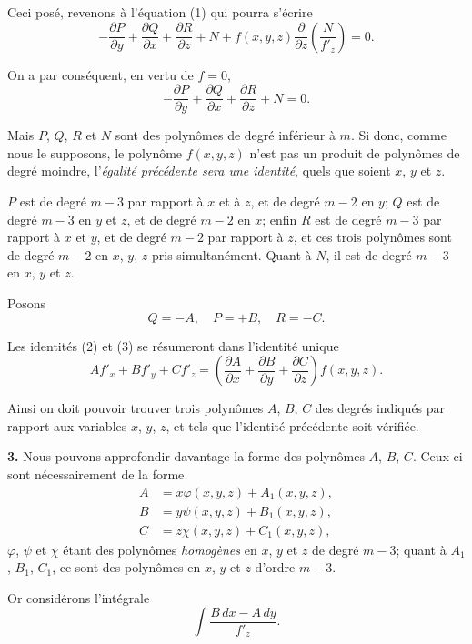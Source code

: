 \documentclass{article}
\begin{document}

Ceci posé, revenons à l'équation (1) qui pourra s'écrire
\[
-\frac{\partial P}{\partial y} + \frac{\partial Q}{\partial x} + \frac{\partial R}{\partial z} + N + f(x, y, z)\frac{\partial}{\partial z}\left(\frac{N}{f'_{z}}\right) = 0.
\]

On a par conséquent, en vertu de $f = 0$,
\[
-\frac{\partial P}{\partial y} + \frac{\partial Q}{\partial x} + \frac{\partial R}{\partial z} + N = 0. \tag{3}
\]

Mais $P$, $Q$, $R$ et $N$ sont des polynômes de degré inférieur à $m$. Si donc, comme nous le supposons, le polynôme $f(x, y, z)$ n'est pas un produit de polynômes de degré moindre, l'\emph{égalité précédente sera une identité}, quels que soient $x$, $y$ et $z$.

$P$ est de degré $m - 3$ par rapport à $x$ et à $z$, et de degré $m - 2$ en $y$; $Q$ est de degré $m - 3$ en $y$ et $z$, et de degré $m - 2$ en $x$; enfin $R$ est de degré $m - 3$ par rapport à $x$ et $y$, et de degré $m - 2$ par rapport à $z$, et ces trois polynômes sont de degré $m - 2$ en $x$, $y$, $z$ pris simultanément. Quant à $N$, il est de degré $m - 3$ en $x$, $y$ et $z$.

Posons
\[
Q = -A, \quad P = +B, \quad R = -C.
\]

Les identités (2) et (3) se résumeront dans l'identité unique
\[
Af'_{x} + Bf'_{y} + Cf'_{z} = \left(\frac{\partial A}{\partial x} + \frac{\partial B}{\partial y} + \frac{\partial C}{\partial z}\right)f(x, y, z).
\]

Ainsi on doit pouvoir trouver trois polynômes $A$, $B$, $C$ des degrés indiqués par rapport aux variables $x$, $y$, $z$, et tels que l'identité précédente soit vérifiée.

\textbf{3.} Nous pouvons approfondir davantage la forme des polynômes $A$, $B$, $C$. Ceux-ci sont nécessairement de la forme
\[
\begin{aligned}
A &= x\varphi(x, y, z) + A_{1}(x, y, z), \\
B &= y\psi(x, y, z) + B_{1}(x, y, z), \\
C &= z\chi(x, y, z) + C_{1}(x, y, z),
\end{aligned}
\]
$\varphi$, $\psi$ et $\chi$ étant des polynômes \emph{homogènes} en $x$, $y$ et $z$ de degré $m - 3$; quant à $A_{1}$, $B_{1}$, $C_{1}$, ce sont des polynômes en $x$, $y$ et $z$ d'ordre $m - 3$.

Or considérons l'intégrale
\[
\int \frac{B\,dx - A\,dy}{f'_{z}}.
\]
\end{document}
